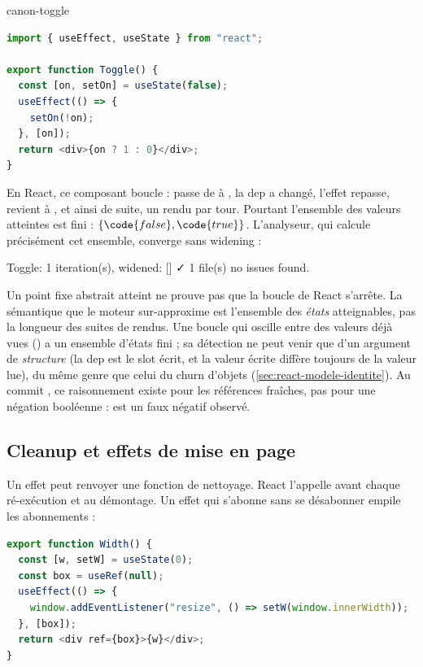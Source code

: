 \begin{exemple}{}{canon-toggle}
\begin{lstlisting}[language=TypeScript,caption={\code{Toggle} (\file{/tmp/ch02/toggle.tsx})},label={lst:react-modele-toggle}]
import { useEffect, useState } from "react";

export function Toggle() {
  const [on, setOn] = useState(false);
  useEffect(() => {
    setOn(!on);
  }, [on]);
  return <div>{on ? 1 : 0}</div>;
}
\end{lstlisting}
\end{exemple}

En React, ce composant boucle :  passe de  à
, la dep a changé, l'effet repasse,  revient à
, et ainsi de suite, un rendu par tour. Pourtant l'ensemble des
valeurs atteintes est fini : $\{\code{false}, \code{true}\}$. L'analyseur,
qui calcule précisément cet ensemble, converge sans widening :

\begin{sortie}
  [verbose] Toggle: 1 iteration(s), widened: []
✓  1 file(s) no issues found.
\end{sortie}

\begin{piege}
Un point fixe abstrait atteint ne prouve pas que la boucle de React s'arrête.
La sémantique que le moteur sur-approxime est l'ensemble des \emph{états}
atteignables, pas la longueur des suites de rendus. Une boucle qui oscille
entre des valeurs déjà vues () a un ensemble d'états fini ; sa
détection ne peut venir que d'un argument de \emph{structure} (la dep est le
slot écrit, et la valeur écrite diffère toujours de la valeur lue), du même
genre que celui du churn d'objets (\cref{sec:react-modele-identite}). Au commit
, ce raisonnement existe pour les références fraîches, pas pour
une négation booléenne :  est un faux négatif observé.
\end{piege}

\subsection{Cleanup et effets de mise en page}

Un effet peut renvoyer une fonction de nettoyage. React l'appelle avant chaque
ré-exécution et au démontage. Un effet qui s'abonne sans se désabonner
empile les abonnements :

\begin{lstlisting}[language=TypeScript,caption={\code{Width} : un abonnement sans cleanup (\file{/tmp/ch02/listener.tsx}, imports omis)},label={lst:react-modele-listener}]
export function Width() {
  const [w, setW] = useState(0);
  const box = useRef(null);
  useEffect(() => {
    window.addEventListener("resize", () => setW(window.innerWidth));
  }, [box]);
  return <div ref={box}>{w}</div>;
}
\end{lstlisting}

